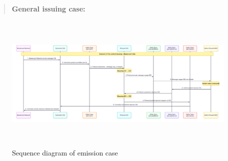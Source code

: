 \documentclass[12pt,a4paper]{report}
\begin{document}
\begin{quote}
 \textbf{General issuing case:}   
\end{quote}

\begin{figure}[H]
\centering
\includegraphics[width=7.10423in,height=2.60249in]{media/image37.png}
\caption{Sequence diagram of emission case}
\label{fig:SDEC}
\end{figure}
\end{document}
